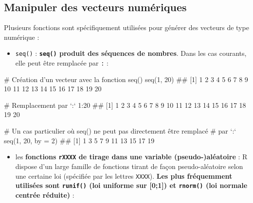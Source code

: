 \documentclass[12pt,twosided, notitlepage]{book}
\newenvironment{Shaded}{}{}
\newcommand{\KeywordTok}[1]{\textcolor[rgb]{0.00,0.00,1.00}{{#1}}}
\newcommand{\DataTypeTok}[1]{{#1}}
\newcommand{\DecValTok}[1]{{#1}}
\newcommand{\CommentTok}[1]{\textcolor[rgb]{0.00,0.50,0.00}{{#1}}}
\newcommand{\NormalTok}[1]{{#1}}
\providecommand{\tightlist}{%
  \setlength{\itemsep}{0pt}\setlength{\parskip}{0pt}}
\renewenvironment{Shaded}{\begin{snugshade}}{\end{snugshade}}
\begin{document}
\subsection{Manipuler des vecteurs
numériques}\label{manipuler-des-vecteurs-numeriques}

Plusieurs fonctions sont spécifiquement utilisées pour générer des
vecteurs de type numérique :

\begin{itemize}
\tightlist
\item
  \texttt{seq()} : \textbf{\texttt{seq()}
  produit des séquences de nombres}. Dans les cas courants, elle peut
  être remplacée par \texttt{:} :
\end{itemize}

\begin{Shaded}
\begin{Highlighting}[]
\CommentTok{# Création d'un vecteur avec la fonction seq()}
\KeywordTok{seq}\NormalTok{(}\DecValTok{1}\NormalTok{, }\DecValTok{20}\NormalTok{)}
  \NormalTok{##  [1]  1  2  3  4  5  6  7  8  9 10 11 12 13 14 15 16 17 18 19 20}

\CommentTok{# Remplacement par `:`}
\DecValTok{1}\NormalTok{:}\DecValTok{20}
  \NormalTok{##  [1]  1  2  3  4  5  6  7  8  9 10 11 12 13 14 15 16 17 18 19 20}

\CommentTok{# Un cas particulier où seq() ne peut pas directement être remplacé}
\CommentTok{# par `:`}
\KeywordTok{seq}\NormalTok{(}\DecValTok{1}\NormalTok{, }\DecValTok{20}\NormalTok{, }\DataTypeTok{by =} \DecValTok{2}\NormalTok{)}
  \NormalTok{##  [1]  1  3  5  7  9 11 13 15 17 19}
\end{Highlighting}
\end{Shaded}

\begin{itemize}
\tightlist
\item
  les \textbf{fonctions \texttt{rXXXX} de tirage dans une variable
  (pseudo-)aléatoire} : R dispose d'un large famille de fonctions tirant
  de façon pseudo-aléatoire selon une certaine loi (spécifiée par les
  lettres \texttt{XXXX}). \textbf{Les plus fréquemment utilisées sont
  \texttt{runif()} (loi uniforme sur {[}0;1{]}) et \texttt{rnorm()} (loi
  normale centrée
  réduite)} :
\end{itemize}
\end{document}
